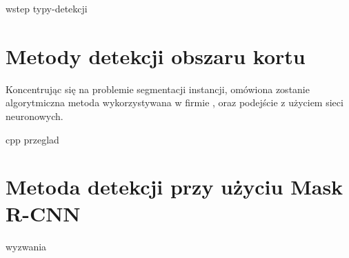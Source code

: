 {wstep}
{typy-detekcji}

\section{Metody detekcji obszaru kortu}
\label{sec:metody_detekcji}

Koncentrując się na problemie segmentacji instancji, omówiona zostanie algorytmiczna metoda wykorzystywana w firmie \blue, oraz podejście z użyciem sieci neuronowych. \\


{cpp}
{przeglad}

\section{Metoda detekcji przy użyciu Mask R-CNN}
{wyzwania}
